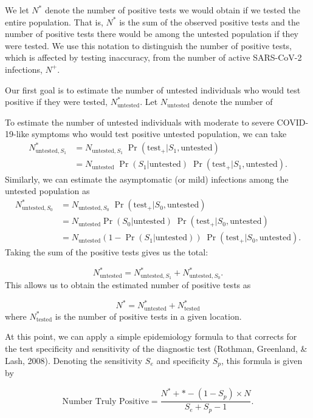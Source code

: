\documentclass[12pt,twoside]{smiththesis}
\begin{document}
We let \(N^*\) denote the number of positive tests we would obtain if we tested the entire population. That is, \(N^*\) is the sum of the observed positive tests and the number of positive tests there would be among the untested population if they were tested. We use this notation to distinguish the number of positive tests, which is affected by testing inaccuracy, from the number of active SARS-CoV-2 infections, \(N^+\).

Our first goal is to estimate the number of untested individuals who would test positive if they were tested, \(N^*_{\text{untested}}\). Let \(N_{\text{untested}}\) denote the number of

To estimate the number of untested individuals with moderate to severe COVID-19-like symptoms who would test positive untested population, we can take
\begin{align*}
N^*_{\text{untested},S_1} &=N_{\text{untested},S_1} \; \Pr(\text{test}_+ | S_1,\text{untested})\\
&=N_{\text{untested}} \; \Pr(S_1|\text{untested}) \; \Pr(\text{test}_+ | S_1,\text{untested}).
\end{align*}
Similarly, we can estimate the asymptomatic (or mild) infections among the untested population as
\begin{align*}
N^*_{\text{untested},S_0} &=N_{\text{untested},S_0} \; \Pr(\text{test}_+ | S_0,\text{untested})\\
&=N_{\text{untested}} \Pr(S_0|\text{untested}) \; \Pr(\text{test}_+ | S_0,\text{untested})\\
&=N_{\text{untested}}(1-\Pr(S_1|\text{untested})) \; \Pr(\text{test}_+ | S_0,\text{untested}).
\end{align*}
Taking the sum of the positive tests gives us the total:

\[N^*_{\text{untested}} = N^*_{\text{untested},S_1} + N^*_{\text{untested},S_0}.\]
This allows us to obtain the estimated number of positive tests as

\[N^* = N^*_{\text{untested}} +N^*_{\text{tested}}\]
where \(N^*_{\text{tested}}\) is the number of positive tests in a given location.

At this point, we can apply a simple epidemiology formula to that corrects for the test specificity and sensitivity of the diagnostic test (Rothman, Greenland, \& Lash, 2008). Denoting the sensitivity \(S_e\) and specificity \(S_p\), this formula is given by

\[\text{Number Truly Positive} = \dfrac{N^*+* - (1-S_p) \times N}{S_e+S_p-1}.\]
\end{document}
